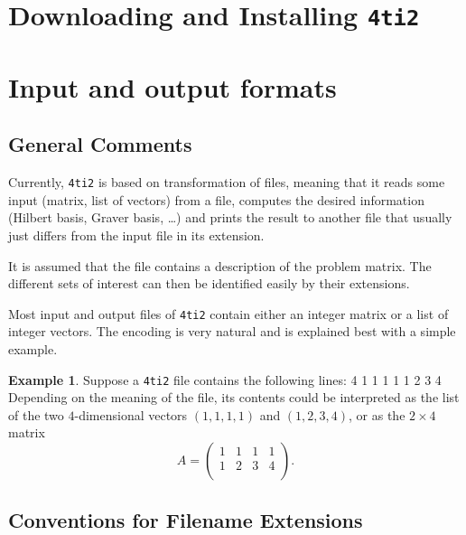 \documentclass[12pt]{article}
\newenvironment{myverbatim}%
  {\quote\verbatim}%
  {\endverbatim\endquote}
\newcommand\File{\begingroup \urlstyle{sf}\Url}
\theoremstyle{definition}
\newtheorem*{Example}{Example}
\newcommand{\FourTiTwo}{{\tt 4ti2}}
\begin{document}
\section{Downloading and Installing \FourTiTwo{}}











\section{Input and output formats}\label{InputOutput}

\subsection{General Comments}
Currently, \FourTiTwo{} is based on transformation of files, meaning
that it reads some input (matrix, list of vectors) from a file,
computes the desired information (Hilbert basis, Graver basis, \ldots)
and prints the result to another file that usually just differs from
the input file in its extension.

It is assumed that the file \File{fileName} contains a description of the
problem matrix. The different sets of interest can then be identified
easily by their extensions.

Most input and output files of \FourTiTwo{} contain either an 
integer matrix or a list of integer vectors. The encoding is
very natural and is explained best with a simple example.

\begin{Example}
  Suppose a \FourTiTwo{} file contains the following lines:
\begin{myverbatim}
2 4
1 1 1 1
1 2 3 4
\end{myverbatim}
Depending on the meaning of the file, its contents could be
interpreted as the list of the two $4$-dimensional vectors $(1,1,1,1)$
and $(1,2,3,4)$, or as the $2\times 4$ matrix
\[
A=
\begin{pmatrix} 
 1 & 1 & 1 & 1 \\ 
 1 & 2 & 3 & 4 \\ 
\end{pmatrix}.
\]
\end{Example}

\subsection{Conventions for Filename Extensions}
\end{document}
